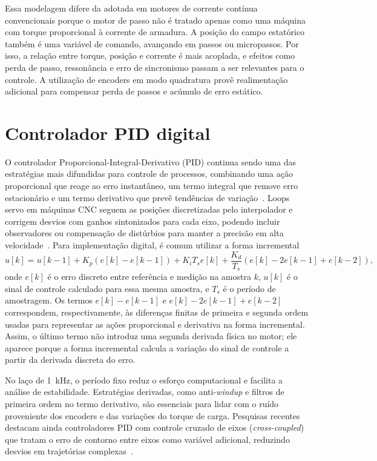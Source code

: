 Essa modelagem difere da adotada em motores de corrente contínua
convencionais porque o motor de passo não é tratado apenas como uma
máquina com torque proporcional à corrente de armadura. A posição do
campo estatórico também é uma variável de comando, avançando em passos ou
micropassos. Por isso, a relação entre torque, posição e corrente é mais
acoplada, e efeitos como perda de passo, ressonância e erro de
sincronismo passam a ser relevantes para o controle. A utilização de
encoders em modo quadratura provê realimentação adicional para compensar
perda de passos e acúmulo de erro estático.

\section{Controlador PID digital}

O controlador Proporcional-Integral-Derivativo (PID) continua sendo uma
das estratégias mais difundidas para controle de processos, combinando
uma ação proporcional que reage ao erro instantâneo, um termo integral
que remove erro estacionário e um termo derivativo que prevê tendências
de variação~\cite{astrom1995}. Loops servo em máquinas CNC seguem as
posições discretizadas pelo interpolador e corrigem desvios com ganhos
sintonizados para cada eixo, podendo incluir observadores ou compensação
de distúrbios para manter a precisão em alta velocidade~\cite{efficient_reference,real_time_interpolators,kung_fpga_motion}.
Para implementação digital, é comum utilizar a forma incremental
\begin{equation}
    u[k] = u[k-1] + K_p(e[k] - e[k-1]) + K_i T_s e[k] + \frac{K_d}{T_s}(e[k] - 2e[k-1] + e[k-2]),
\end{equation}
onde $e[k]$ é o erro discreto entre referência e medição na amostra $k$,
$u[k]$ é o sinal de controle calculado para essa mesma amostra, e $T_s$ é
o período de amostragem. Os termos $e[k]-e[k-1]$ e
$e[k]-2e[k-1]+e[k-2]$ correspondem, respectivamente, às diferenças
finitas de primeira e segunda ordem usadas para representar as ações
proporcional e derivativa na forma incremental. Assim, o último termo não
introduz uma segunda derivada física no motor; ele aparece porque a forma
incremental calcula a variação do sinal de controle a partir da derivada
discreta do erro.

No laço de \SI{1}{\kilo\hertz}, o período fixo reduz o esforço
computacional e facilita a análise de estabilidade. Estratégias
derivadas, como anti-\emph{windup} e filtros de primeira ordem no termo
derivativo, são essenciais para lidar com o ruído proveniente dos
encoders e das variações do torque de carga. Pesquisas recentes destacam
ainda controladores PID com controle cruzado de eixos
(\emph{cross-coupled}) que tratam o erro de contorno entre eixos como
variável adicional, reduzindo desvios em trajetórias complexas~\cite{adaptive_fuzzy_pid}.

